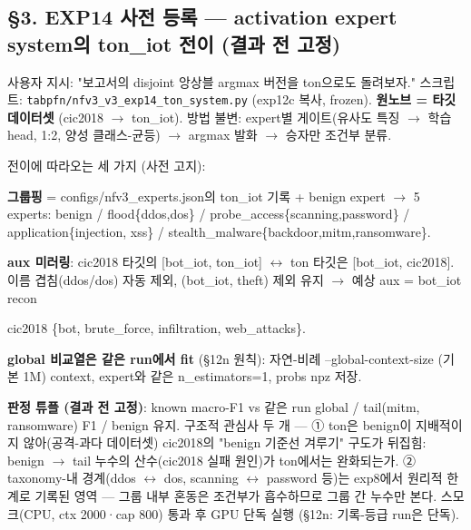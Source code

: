 \subsection{§3. EXP14 사전 등록 — activation expert system의 ton\_\allowbreak{}iot 전이 (결과 전 고정)}
사용자 지시: "보고서의 disjoint 앙상블 argmax 버전을 ton으로도 돌려보자." 스크립트: \texttt{tabpfn/\allowbreak{}\allowbreak{}n\allowbreak{}fv3\_\allowbreak{}\allowbreak{}v3\_\allowbreak{}\allowbreak{}e\allowbreak{}xp14\_\allowbreak{}\allowbreak{}ton\allowbreak{}\_\allowbreak{}\allowbreak{}system.\allowbreak{}py} (exp12c 복사, frozen). \textbf{원노브 =\allowbreak{} 타깃 데이터셋} (cic2018  \ensuremath{\rightarrow}  ton\_\allowbreak{}iot). 방법 불변: expert별 게이트(유사도 특징  \ensuremath{\rightarrow}  학습 head, 1:2, 양성 클래스-균등)  \ensuremath{\rightarrow}  argmax 발화  \ensuremath{\rightarrow}  승자만 조건부 분류.

전이에 따라오는 세 가지 (사전 고지):

\par\noindent \textbullet\enspace \textbf{그룹핑} =\allowbreak{} configs/\allowbreak{}nfv3\_\allowbreak{}experts.json의 ton\_\allowbreak{}iot 기록 +\allowbreak{} benign expert  \ensuremath{\rightarrow}  5 experts: benign /\allowbreak{} flood\{ddos,dos\} /\allowbreak{} probe\_\allowbreak{}access\{scanning,password\} /\allowbreak{} application\{injection, xss\} /\allowbreak{} stealth\_\allowbreak{}malware\{backdoor,mitm,ransomware\}.


\par\noindent \textbullet\enspace \textbf{aux 미러링}: cic2018 타깃의 [bot\_\allowbreak{}iot, ton\_\allowbreak{}iot]  \ensuremath{\leftrightarrow}  ton 타깃은 [bot\_\allowbreak{}iot, cic2018]. 이름 겹침(ddos/\allowbreak{}dos) 자동 제외, (bot\_\allowbreak{}iot, theft) 제외 유지  \ensuremath{\rightarrow}  예상 aux =\allowbreak{} bot\_\allowbreak{}iot recon

\par\noindent \textbullet\enspace cic2018 \{bot, brute\_\allowbreak{}force, infiltration, web\_\allowbreak{}attacks\}.



\par\noindent \textbullet\enspace \textbf{global 비교열은 같은 run에서 fit} (§12n 원칙): 자연-비례 --global-context-size (기본 1M) context, expert와 같은 n\_\allowbreak{}estimators=\allowbreak{}1, probs npz 저장.


\textbf{판정 튜플 (결과 전 고정)}: known macro-F1 vs 같은 run global /\allowbreak{} tail(mitm, ransomware) F1 /\allowbreak{} benign 유지. 구조적 관심사 두 개 — ① ton은 benign이 지배적이지 않아(공격-과다 데이터셋) cic2018의 "benign 기준선 겨루기" 구도가 뒤집힘: benign \ensuremath{\rightarrow} tail 누수의 산수(cic2018 실패 원인)가 ton에서는 완화되는가. ② taxonomy-내 경계(ddos \ensuremath{\leftrightarrow} dos, scanning \ensuremath{\leftrightarrow} password 등)는 exp8에서 원리적 한계로 기록된 영역 — 그룹 내부 혼동은 조건부가 흡수하므로 그룹 간 누수만 본다. 스모크(CPU, ctx 2000·cap 800) 통과 후 GPU 단독 실행 (§12n: 기록-등급 run은 단독).

